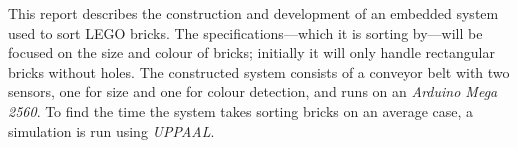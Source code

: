 {This report describes the construction and development of an embedded system used to sort LEGO bricks.
The specifications---which it is sorting by---will be focused on the size and colour of bricks; initially it will only handle rectangular bricks without holes.
The constructed system consists of a conveyor belt with two sensors, one for size and one for colour detection, and runs on an \textit{Arduino Mega 2560}.
To find the time the system takes sorting bricks on an average case, a simulation is run using \textit{UPPAAL}.}

